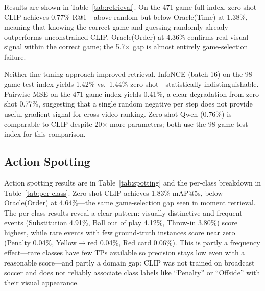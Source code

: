 \documentclass[10pt,twocolumn]{article}
\begin{document}
Results are shown in Table~\ref{tab:retrieval}. On the 471-game full index, zero-shot CLIP achieves 0.77\% R@1---above random but below Oracle(Time) at 1.38\%, meaning that knowing the correct game and guessing randomly already outperforms unconstrained CLIP. Oracle(Order) at 4.36\% confirms real visual signal within the correct game; the 5.7$\times$ gap is almost entirely game-selection failure.

Neither fine-tuning approach improved retrieval. InfoNCE (batch 16) on the 98-game test index yields 1.42\% vs.\ 1.44\% zero-shot---statistically indistinguishable. Pairwise MSE on the 471-game index yields 0.41\%, a clear degradation from zero-shot 0.77\%, suggesting that a single random negative per step does not provide useful gradient signal for cross-video ranking. Zero-shot Qwen (0.76\%) is comparable to CLIP despite 20$\times$ more parameters; both use the 98-game test index for this comparison.

\subsection{Action Spotting}

\begin{table}[t]
  \centering
  \caption{Action spotting mAP (\%), 500 games. $^\dagger$Qwen evaluated on 100 test games only.}
  \label{tab:spotting}
\end{table}

Action spotting results are in Table~\ref{tab:spotting} and the per-class breakdown in Table~\ref{tab:per-class}. Zero-shot CLIP achieves 1.83\% mAP@5s, below Oracle(Order) at 4.64\%---the same game-selection gap seen in moment retrieval. The per-class results reveal a clear pattern: visually distinctive and frequent events (Substitution 4.91\%, Ball out of play 4.12\%, Throw-in 3.80\%) score highest, while rare events with few ground-truth instances score near zero (Penalty 0.04\%, Yellow$\to$red 0.04\%, Red card 0.06\%). This is partly a frequency effect---rare classes have few TPs available so precision stays low even with a reasonable score---and partly a domain gap: CLIP was not trained on broadcast soccer and does not reliably associate class labels like ``Penalty'' or ``Offside'' with their visual appearance.
\end{document}
